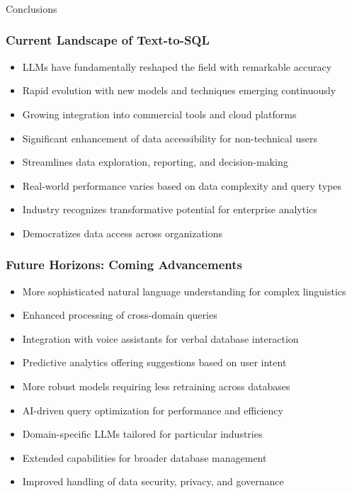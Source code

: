 \begin{frame}[fragile]\frametitle{}
\begin{center}
{\Large Conclusions}
\end{center}
\end{frame}

\begin{frame}\frametitle{Current Landscape of Text-to-SQL}
      \begin{itemize}
        \item LLMs have fundamentally reshaped the field with remarkable accuracy
        \item Rapid evolution with new models and techniques emerging continuously
        \item Growing integration into commercial tools and cloud platforms
        \item Significant enhancement of data accessibility for non-technical users
        \item Streamlines data exploration, reporting, and decision-making
        \item Real-world performance varies based on data complexity and query types
        \item Industry recognizes transformative potential for enterprise analytics
        \item Democratizes data access across organizations
      \end{itemize}
\end{frame}

\begin{frame}\frametitle{Future Horizons: Coming Advancements}
      \begin{itemize}
        \item More sophisticated natural language understanding for complex linguistics
        \item Enhanced processing of cross-domain queries
        \item Integration with voice assistants for verbal database interaction
        \item Predictive analytics offering suggestions based on user intent
        \item More robust models requiring less retraining across databases
        \item AI-driven query optimization for performance and efficiency
        \item Domain-specific LLMs tailored for particular industries
        \item Extended capabilities for broader database management
        \item Improved handling of data security, privacy, and governance
      \end{itemize}
\end{frame}

